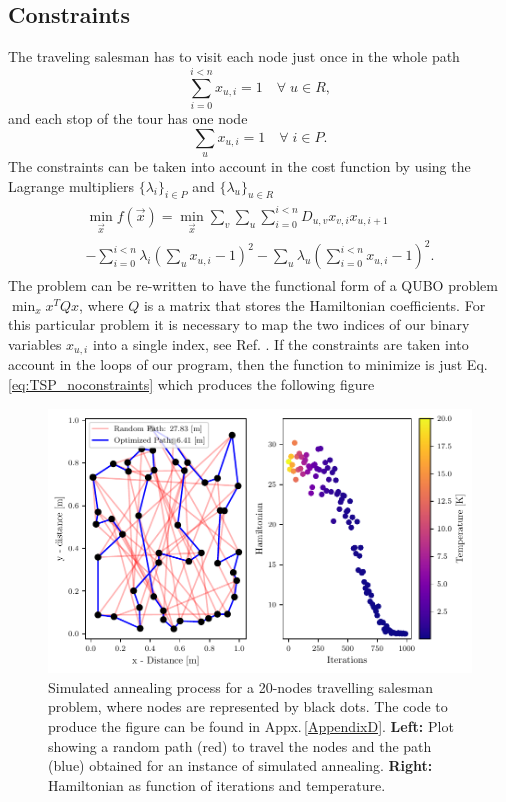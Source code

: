 \subsection{Constraints}
The traveling salesman has to visit each node just once in the whole path
\begin{equation}
    \sum_{i=0}^{i<n}x_{u,i} = 1 \quad  \forall \; u \in R,
\end{equation}
and each stop of the tour has one node
\begin{equation}
    \sum_{u}x_{u, i} = 1 \quad  \forall \; i \in P.
\end{equation}
The constraints can be taken into account in the cost function by using the Lagrange multipliers $\{\lambda_{i}\}_{i \in P}$ and $\{\lambda_{u}\}_{u \in R}$
\begin{align}
        \label{eq: ObjectiveMatrixFunction}
    \begin{split}
   \min_{\vec{x}} f(\vec{x}) = \min_{\vec{x}} \sum_{v} \sum_{u} \sum_{i=0}^{i<n}D_{u,v}x_{v,i}x_{u, i+1}\\
   - \sum_{i=0}^{i<n}\lambda_{i}\left(\sum_{u} x_{u, i} - 1\right)^{2} - \sum_{u}\lambda_{u} \left( \sum_{i=0}^{i<n}x_{u,i} - 1\right)^{2}.
\end{split}
\end{align}
The problem can be re-written to have the functional form of a QUBO problem $\min_{x}x^{T}Qx$, where $Q$ is a matrix that stores the Hamiltonian coefficients. For this particular problem it is necessary to map the two indices of our binary variables $x_{u,i}$ into a single index, see Ref. \cite{Jain2021SolvingComputer}.
If the constraints are taken into account in the loops of our program, then the function to minimize is just Eq.\,\eqref{eq:TSP_noconstraints} which produces the following figure
\begin{figure}[H]
    \centering
    \includegraphics[width=\textwidth]{Figures/TSP_SA.pdf}
    \caption{Simulated annealing process for a 20-nodes travelling salesman problem, where nodes are represented by black dots. The code to produce the figure can be found in Appx.\,\ref{AppendixD}.\textbf{ Left:} Plot showing a random path (red) to travel the nodes and the path (blue) obtained for an instance of simulated annealing. \textbf{Right:} Hamiltonian as function of iterations and temperature.}
    \label{fig:TSP_SA}
\end{figure}

